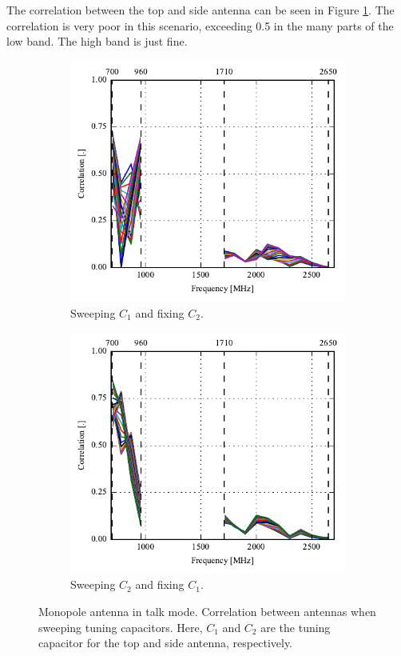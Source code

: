 The correlation between the top and side antenna can be seen in Figure \ref{fig:corr_mono_modi_talk_mode}. The correlation is very poor in this scenario, exceeding 0.5 in the many parts of the low band. The high band is just fine.
\begin{figure}[htbp]
    \centering
    \begin{subfigure}{0.49\linewidth}
        \includegraphics{img/tech_sol/monopole/highband/ue/talkmode/corr_top.pdf}
        \caption{Sweeping $C_1$ and fixing $C_2$.}
    \end{subfigure}
    \hfill
    \begin{subfigure}{0.49\linewidth}
        \includegraphics{img/tech_sol/monopole/highband/ue/talkmode/corr_side.pdf}
        \caption{Sweeping $C_2$ and fixing $C_1$.}
    \end{subfigure}
    \caption{Monopole antenna in talk mode. Correlation between antennas when sweeping tuning capacitors. Here, $C_1$ and $C_2$ are the tuning capacitor for the top and side antenna, respectively.}
    \label{fig:corr_mono_modi_talk_mode}
\end{figure}

